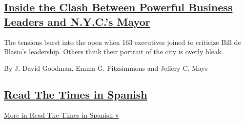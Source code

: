 \begin{enumerate}
  \hypertarget{inside-the-clash-between-powerful-business-leaders-and-nycs-mayor}{%
  \subsection{\texorpdfstring{\href{/2020/09/12/nyregion/coronavirus-business-nyc-reopen.html}{Inside
  the Clash Between Powerful Business Leaders and N.Y.C.'s
  Mayor}}{Inside the Clash Between Powerful Business Leaders and N.Y.C.'s Mayor}}\label{inside-the-clash-between-powerful-business-leaders-and-nycs-mayor}}

  The tensions burst into the open when 163 executives joined to
  criticize Bill de Blasio's leadership. Others think their portrait of
  the city is overly bleak.

  By J. David Goodman, Emma G. Fitzsimmons and Jeffery C. Mays
\end{enumerate}

\hypertarget{read-the-times-in-spanish}{%
\subsection{\texorpdfstring{\href{/spotlight/read-the-times-in-spanish}{Read
The Times in
Spanish}}{Read The Times in Spanish}}\label{read-the-times-in-spanish}}

\href{/spotlight/read-the-times-in-spanish}{More in Read The Times in
Spanish »}

